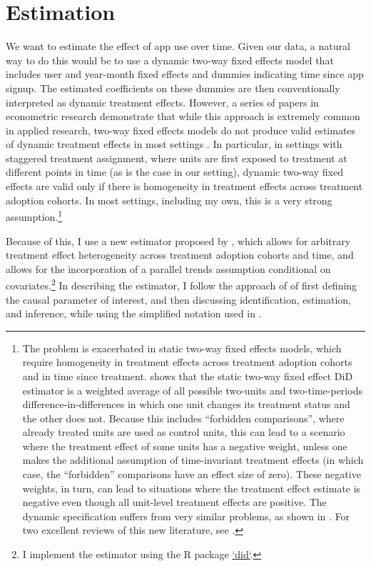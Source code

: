 
\section{Estimation}%
\label{sec:estimation}

We want to estimate the effect of app use over time. Given our data, a natural
way to do this would be to use a dynamic two-way fixed effects model that
includes user and year-month fixed effects and dummies indicating time since
app signup. The estimated coefficients on these dummies are then conventionally
interpreted as dynamic treatment effects. However, a series of papers in
econometric research demonstrate that while this approach is extremely common
in applied research, two-way fixed effects models do not produce valid
estimates of dynamic treatment effects in most settings
\citep{roth2022trending}. In particular, in settings with staggered treatment
assignment, where units are first exposed to treatment at different points in
time (as is the case in our setting), dynamic two-way fixed effects are valid
only if there is homogeneity in treatment effects across treatment adoption
cohorts. In most settings, including my own, this is a very strong
assumption.\footnote{The problem is exacerbated in static two-way fixed effects
    models, which require homogeneity in treatment effects across treatment
    adoption cohorts and in time since treatment. \citet{goodman2021difference}
    shows that the static two-way fixed effect DiD estimator is a weighted
    average of all possible two-units and two-time-periods
    difference-in-differences in which one unit changes its treatment status
    and the other does not. Because this includes ``forbidden comparisons'',
    where already treated units are used as control units, this can lead to a
    scenario where the treatment effect of some units has a negative weight,
    unless one makes the additional assumption of time-invariant treatment
    effects (in which case, the ``forbidden'' comparisons have an effect size
    of zero). These negative weights, in turn, can lead to situations where the
    treatment effect estimate is negative even though all unit-level treatment
    effects are positive. The dynamic specification suffers from very similar
    problems, as shown in \citet{sun2021estimating}. For two excellent
    reviews of this new literature, see \citet{roth2022trending,
baker2022much}.}

Because of this, I use a new estimator proposed by
\citet{callaway2021difference}, which allows for arbitrary treatment effect
heterogeneity across treatment adoption cohorts and time, and allows for the
incorporation of a parallel trends assumption conditional on
covariates.\footnote{I implement the estimator using the R package
\href{https://bcallaway11.github.io/did/}{`did`}.} In
describing the estimator, I follow the approach of
\citet{callaway2021difference} of first defining the causal parameter of
interest, and then discussing identification, estimation, and inference, while
using the simplified notation used in \citet{roth2022trending}.

